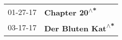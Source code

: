 \begin{supertabular}{p{0.25\columnwidth}p{0.75\columnwidth}}
 01-27-17 &      \textbf{Chapter 20\textsuperscript{$\wedge$*}} \\
 03-17-17 &  \textbf{Der Bluten Kat\textsuperscript{$\wedge$*}} \\
\end{supertabular}
